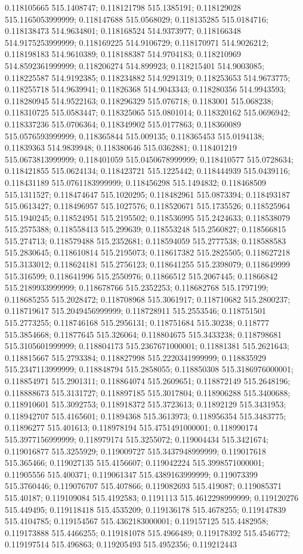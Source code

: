 0.118105665 515.1408747; 0.118121798 515.1385191; 0.118129028 515.1165053999999; 0.118147688 515.0568029; 0.118135285 515.0184716; 0.118138473 514.9634801; 0.118168524 514.9373977; 0.118166348 514.9175253999999; 0.118169225 514.9106729; 0.118170971 514.9026212; 0.118198183 514.9610389; 0.118188387 514.9704183; 0.118210969 514.8592361999999; 0.118206274 514.899923; 0.118215401 514.9003085; 0.118225587 514.9192385; 0.118234882 514.9291319; 0.118253653 514.9673775; 0.118255718 514.9639941; 0.11826368 514.9043343; 0.118280356 514.9943593; 0.118280945 514.9522163; 0.118296329 515.076718; 0.1183001 515.068238; 0.118310725 515.0583447; 0.118325065 515.0801014; 0.118320162 515.0696942; 0.118337236 515.0706364; 0.118349902 515.0177863; 0.118360089 515.0576593999999; 0.118365844 515.009135; 0.118365453 515.0194138; 0.11839363 514.9839948; 0.118380646 515.0362881; 0.118401219 515.0673813999999; 0.118401059 515.0450678999999; 0.118410577 515.0728634; 0.118421855 515.0624134; 0.118423721 515.1225442; 0.118444939 515.0439116; 0.118431189 515.0761183999999; 0.118456298 515.1494832; 0.118468509 515.1311527; 0.118474647 515.1020295; 0.118482961 515.0873394; 0.118493187 515.0613427; 0.118496957 515.1027576; 0.118520671 515.1735526; 0.118525964 515.1940245; 0.118524951 515.2195502; 0.118536995 515.2424633; 0.118538079 515.2575388; 0.118558413 515.299639; 0.118553248 515.2560827; 0.118566815 515.274713; 0.118579488 515.2352681; 0.118594059 515.2777538; 0.118588583 515.2830645; 0.118610814 515.2195073; 0.118617382 515.2825505; 0.118627218 515.3133012; 0.118624181 515.2756123; 0.118641255 515.2398079; 0.118649999 515.316599; 0.118641996 515.2550976; 0.11866512 515.2067445; 0.11866842 515.2189933999999; 0.118678766 515.2352253; 0.118682768 515.1797199; 0.118685255 515.2028472; 0.118708968 515.3061917; 0.118710682 515.2800237; 0.118719617 515.2049456999999; 0.118728911 515.2553546; 0.118751501 515.2773255; 0.118746168 515.2956131; 0.118751684 515.30238; 0.118777 515.3854668; 0.11877645 515.326064; 0.118804675 515.3433238; 0.118798681 515.3105601999999; 0.118804173 515.2367671000001; 0.11881381 515.2621643; 0.118815667 515.2793384; 0.118827998 515.2220341999999; 0.118835929 515.2347113999999; 0.118848794 515.2858055; 0.118850308 515.3186976000001; 0.118854971 515.2901311; 0.118864074 515.2609651; 0.118872149 515.2648196; 0.118888673 515.3131727; 0.118897185 515.3017804; 0.118906288 515.3400688; 0.118910601 515.3092753; 0.118918372 515.3723613; 0.11892129 515.3431953; 0.118942707 515.4165601; 0.11894368 515.3613973; 0.118956354 515.3483775; 0.11896277 515.401613; 0.118978194 515.4751491000001; 0.118990174 515.3977156999999; 0.118979174 515.3255072; 0.119004434 515.3421674; 0.119016877 515.3255929; 0.119009727 515.3437948999999; 0.119017618 515.365466; 0.119027135 515.4156607; 0.119042224 515.3998571000001; 0.11905556 515.400371; 0.119061347 515.4389163999999; 0.119073399 515.3760446; 0.119076707 515.407866; 0.119082693 515.419087; 0.119085371 515.40187; 0.119109084 515.4192583; 0.1191113 515.4612298999999; 0.119120276 515.449495; 0.119118418 515.4535209; 0.119136178 515.4678255; 0.119147839 515.4104785; 0.119154567 515.4362183000001; 0.119157125 515.4482958; 0.119173888 515.4466255; 0.119181078 515.4966489; 0.119178392 515.4546772; 0.119197514 515.496863; 0.119205493 515.4952356; 0.119212443 